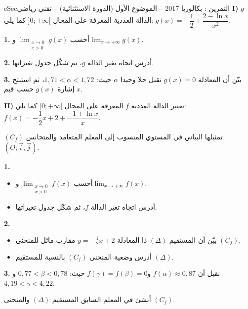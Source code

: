 \documentclass[12pt,a4paper]{article}
\newenvironment{BOX}[2]{\begin{otherlanguage}{english}\begin{arbox}{#1}{#2}}{\end{arbox}\end{otherlanguage}}
\newcounter{exo}
\newenvironment{tamrin}[1]{\stepcounter{exo}\begin{BOX}{cSec}{التمرين \theexo: #1}}{\end{BOX}}
\newenvironment{sq}{\begin{itemize}[leftmargin=2.4em,itemsep=3pt]}{\end{itemize}}
\newcommand{\qa}{\item[(أ)]}\newcommand{\qb}{\item[(ب)]}\newcommand{\qc}{\item[(جـ)]}\newcommand{\qd}{\item[(د)]}\newcommand{\qe}{\item[(هـ)]}
\newcommand{\QQ}[1]{\par\smallskip\textbf{#1.} }
\begin{document}
\begin{tamrin}{بكالوريا 2017 -- الموضوع الأول (الدورة الاستثنائية) -- تقني رياضي}
\textbf{I)} $g$ الدالة العددية المعرفة على المجال $]0;+\infty[$ كما يلي: $g(x)=-\dfrac12+\dfrac{2-\ln x}{x^2}$.
\QQ{1} أحسب $\displaystyle\lim_{\substack{x\to0\\x>0}}g(x)$ و$\displaystyle\lim_{x\to+\infty}g(x)$.
\QQ{2} أدرس اتجاه تغير الدالة $g$، ثم شكّل جدول تغيراتها.
\QQ{3} بيّن أن المعادلة $g(x)=0$ تقبل حلا وحيدا $\alpha$ حيث: $1{,}71<\alpha<1{,}72$، ثم استنتج إشارة $g(x)$ حسب قيم $x$.

\textbf{II)} نعتبر الدالة العددية $f$ المعرفة على المجال $]0;+\infty[$ كما يلي: $f(x)=-\dfrac12x+2+\dfrac{-1+\ln x}{x}$.

$(C_f)$ تمثيلها البياني في المستوي المنسوب إلى المعلم المتعامد والمتجانس $(O;\vec{i},\vec{j})$.
\QQ{1}
\begin{sq}
\qa أحسب $\displaystyle\lim_{\substack{x\to0\\x>0}}f(x)$ و$\displaystyle\lim_{x\to+\infty}f(x)$.
\qb أدرس اتجاه تغير الدالة $f$، ثم شكّل جدول تغيراتها.
\end{sq}
\QQ{2}
\begin{sq}
\qa بيّن أن المستقيم $(\Delta)$ ذا المعادلة $y=-\frac12x+2$ مقارب مائل للمنحنى $(C_f)$.
\qb أدرس وضعية المنحنى $(C_f)$ بالنسبة للمستقيم $(\Delta)$.
\end{sq}
\QQ{3} نقبل أن $f(\alpha)\approx0{,}87$ و$f(\gamma)=f(\beta)=0$ حيث: $0{,}77<\beta<0{,}78$ و$4{,}19<\gamma<4{,}22$.

أنشئ في المعلم السابق المستقيم $(\Delta)$ والمنحنى $(C_f)$.
\end{tamrin}
\end{document}
